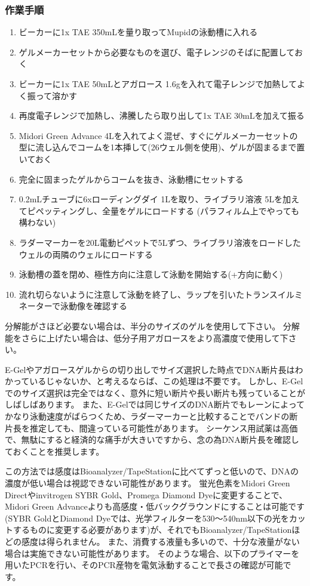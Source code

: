 \documentclass[titlepage,10pt,a4paper,uplatex]{jsbook}
\begin{document}
\subsubsection{作業手順}
\begin{enumerate}
\item ビーカーに1x TAE 350mLを量り取ってMupidの泳動槽に入れる
\item ゲルメーカーセットから必要なものを選び、電子レンジのそばに配置しておく
\item ビーカーに1x TAE 50mLとアガロース 1.6gを入れて電子レンジで加熱してよく振って溶かす
\item 再度電子レンジで加熱し、沸騰したら取り出して1x TAE 30mLを加えて振る
\item Midori Green Advance 4{\textmu}Lを入れてよく混ぜ、すぐにゲルメーカーセットの型に流し込んでコームを1本挿して(26ウェル側を使用)、ゲルが固まるまで置いておく
\item 完全に固まったゲルからコームを抜き、泳動槽にセットする
\item 0.2mLチューブに6xローディングダイ 1{\textmu}Lを取り、ライブラリ溶液 5{\textmu}Lを加えてピペッティングし、全量をゲルにロードする (パラフィルム上でやっても構わない)
\item ラダーマーカーを20{\textmu}L電動ピペットで5{\textmu}Lずつ、ライブラリ溶液をロードしたウェルの両隣のウェルにロードする
\item 泳動槽の蓋を閉め、極性方向に注意して泳動を開始する(+方向に動く)
\item 流れ切らないように注意して泳動を終了し、ラップを引いたトランスイルミネーターで泳動像を確認する
\end{enumerate}

分解能がさほど必要ない場合は、半分のサイズのゲルを使用して下さい。
分解能をさらに上げたい場合は、低分子用アガロースをより高濃度で使用して下さい。

E-Gelやアガロースゲルからの切り出しでサイズ選択した時点でDNA断片長はわかっているじゃないか、と考えるならば、この処理は不要です。
しかし、E-Gelでのサイズ選択は完全ではなく、意外に短い断片や長い断片も残っていることがしばしばあります。
また、E-Gelでは同じサイズのDNA断片でもレーンによってかなり泳動速度がばらつくため、ラダーマーカーと比較することでバンドの断片長を推定しても、間違っている可能性があります。
シーケンス用試薬は高価で、無駄にすると経済的な痛手が大きいですから、念の為DNA断片長を確認しておくことを推奨します。

この方法では感度はBioanalyzer/TapeStationに比べてずっと低いので、DNAの濃度が低い場合は視認できない可能性があります。
蛍光色素をMidori Green Directやinvitrogen SYBR Gold、Promega Diamond Dyeに変更することで、Midori Green Advanceよりも高感度・低バックグラウンドにすることは可能です(SYBR GoldとDiamond Dyeでは、光学フィルターを530～540nm以下の光をカットするものに変更する必要があります)が、それでもBioanalyzer/TapeStationほどの感度は得られません。
また、消費する液量も多いので、十分な液量がない場合は実施できない可能性があります。
そのような場合、以下のプライマーを用いたPCRを行い、そのPCR産物を電気泳動することで長さの確認が可能です。
\end{document}
